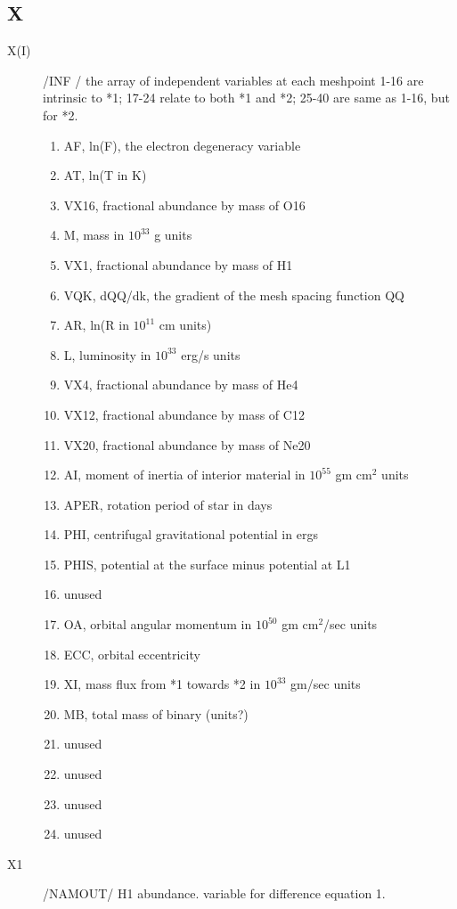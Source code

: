 \documentclass{article}
\begin{document}
\subsection*{X}
\begin{description}

    \item[X(I)]       	/INF   / the array of independent variables at each meshpoint
     			1-16 are intrinsic to *1; 17-24 relate to both *1 and *2; 25-40 are same as 1-16, but for *2.
			\begin{enumerate}
         			 \item AF,		ln(F), the electron degeneracy variable
         			 \item AT,		ln(T in K)
         			  \item VX16,		fractional abundance by mass of O16
         			  \item M,		mass in $10^{33}$ g units
         			  \item VX1,		fractional abundance by mass of H1
         			  \item VQK,		dQQ/dk, the gradient of the mesh spacing function QQ
         			  \item AR,		ln(R in $10^{11}$ cm units)
         			  \item L,		luminosity in $10^{33}$ erg/s units
         			  \item VX4,		fractional abundance by mass of He4
         			 \item VX12,		fractional abundance by mass of C12
         			 \item VX20,		fractional abundance by mass of Ne20
         			 \item AI,		moment of inertia of interior material in $10^{55}$ gm cm$^2$ units
         			 \item APER,		rotation period of star in days
         			 \item PHI,		centrifugal gravitational potential in ergs
         			 \item PHIS,		potential at the surface minus potential at L1
         			 \item	 	unused
         			 \item OA,		orbital angular momentum in $10^{50}$ gm cm$^2$/sec units
         			 \item ECC,		orbital eccentricity
         			 \item XI,		mass flux from *1 towards *2 in $10^{33}$ gm/sec units
         			 \item MB,		total mass of binary (units?)
         			 \item		unused
         			 \item		unused
         			 \item		unused
         			 \item		unused
		\end{enumerate}
    \item[X1]      	/NAMOUT/  H1 abundance. variable for difference equation 1.


\end{description}
\end{document}
